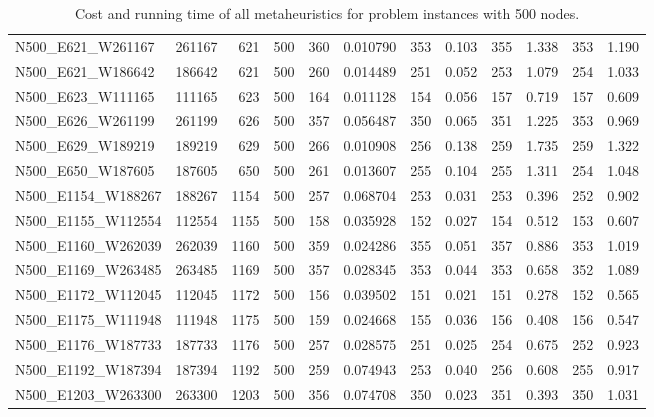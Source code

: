 \begin{landscape}
\begin{table}
\begin{tabular}{lrrrrrrrrrrr}
N500\_E621\_W261167  &       261167 &   621 &   500 &  360 &  0.010790 &    353 &   0.103 &   355 &   1.338 &  353 &   1.190 \\
N500\_E621\_W186642  &       186642 &   621 &   500 &  260 &  0.014489 &    251 &   0.052 &   253 &   1.079 &  254 &   1.033 \\
N500\_E623\_W111165  &       111165 &   623 &   500 &  164 &  0.011128 &    154 &   0.056 &   157 &   0.719 &  157 &   0.609 \\
N500\_E626\_W261199  &       261199 &   626 &   500 &  357 &  0.056487 &    350 &   0.065 &   351 &   1.225 &  353 &   0.969 \\
N500\_E629\_W189219  &       189219 &   629 &   500 &  266 &  0.010908 &    256 &   0.138 &   259 &   1.735 &  259 &   1.322 \\
N500\_E650\_W187605  &       187605 &   650 &   500 &  261 &  0.013607 &    255 &   0.104 &   255 &   1.311 &  254 &   1.048 \\
N500\_E1154\_W188267 &       188267 &  1154 &   500 &  257 &  0.068704 &    253 &   0.031 &   253 &   0.396 &  252 &   0.902 \\
N500\_E1155\_W112554 &       112554 &  1155 &   500 &  158 &  0.035928 &    152 &   0.027 &   154 &   0.512 &  153 &   0.607 \\
N500\_E1160\_W262039 &       262039 &  1160 &   500 &  359 &  0.024286 &    355 &   0.051 &   357 &   0.886 &  353 &   1.019 \\
N500\_E1169\_W263485 &       263485 &  1169 &   500 &  357 &  0.028345 &    353 &   0.044 &   353 &   0.658 &  352 &   1.089 \\
N500\_E1172\_W112045 &       112045 &  1172 &   500 &  156 &  0.039502 &    151 &   0.021 &   151 &   0.278 &  152 &   0.565 \\
N500\_E1175\_W111948 &       111948 &  1175 &   500 &  159 &  0.024668 &    155 &   0.036 &   156 &   0.408 &  156 &   0.547 \\
N500\_E1176\_W187733 &       187733 &  1176 &   500 &  257 &  0.028575 &    251 &   0.025 &   254 &   0.675 &  252 &   0.923 \\
N500\_E1192\_W187394 &       187394 &  1192 &   500 &  259 &  0.074943 &    253 &   0.040 &   256 &   0.608 &  255 &   0.917 \\
N500\_E1203\_W263300 &       263300 &  1203 &   500 &  356 &  0.074708 &    350 &   0.023 &   351 &   0.393 &  350 &   1.031 \\
\bottomrule
\end{tabular}
\caption{Cost and running time of all metaheuristics for problem instances with 500 nodes.}
\label{table:500-results}
\end{table}

\end{landscape}

